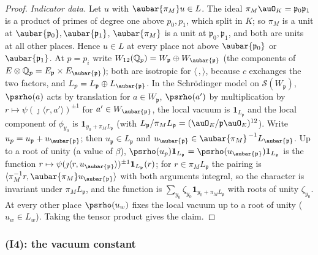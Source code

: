 \documentclass[10pt]{amsart}
\theoremstyle{definition}
\theoremstyle{remark}
\newcommand{\Q}{\mathbb Q}
\begin{document}
\begin{proof}
\emph{Indicator data.} Let $u$ with $\aubar{\pi_M}u\in L$. The ideal $\pi_M\auO_K=\mathfrak p_0
\mathfrak p_1$ is a product of primes of degree one above $p_0,p_1$, which split in $K$; so $\pi_M$
is a unit at $\aubar{\mathfrak p_0},\aubar{\mathfrak p_1}$, $\aubar{\pi_M}$ is a unit at
$\mathfrak p_0,\mathfrak p_1$, and both are units at all other places. Hence $u\in L$ at every
place not above $\aubar{\mathfrak p_0}$ or $\aubar{\mathfrak p_1}$. At
$p=p_i$ write $W_{12}(\Q_p)=W_{\mathfrak p}\oplus W_{\aubar{\mathfrak p}}$ (the components of
$E\otimes\Q_p=E_{\mathfrak p}\times E_{\aubar{\mathfrak p}}$); both are isotropic for $\langle\,,
\rangle$, because $c$ exchanges the two factors, and $L_p=L_{\mathfrak p}\oplus L_{\aubar{\mathfrak
p}}$. In the Schr\"odinger model on $\mathcal S(W_{\mathfrak p})$, $\psrho(a)$ acts by translation
for $a\in W_{\mathfrak p}$, $\psrho(a')$ by multiplication by $r\mapsto\psi(\jmath\langle r,a'
\rangle)^{\pm1}$ for $a'\in W_{\aubar{\mathfrak p}}$, the local vacuum is $\mathbf 1_{L_{\mathfrak
p}}$ and the local component of $\phi_{y_0}$ is $\mathbf 1_{y_0+\pi_ML_{\mathfrak p}}$ (with $L_{\mathfrak
p}/\pi_ML_{\mathfrak p}=(\auO_E/\mathfrak p\auO_E)^{12}$). Write $u_p=u_{\mathfrak p}+u_{\aubar{
\mathfrak p}}$; then $u_{\mathfrak p}\in L_{\mathfrak p}$ and $u_{\aubar{\mathfrak p}}\in
\aubar{\pi_M}^{\,-1}L_{\aubar{\mathfrak p}}$. Up to a root of unity (a value of $\beta$),
$\psrho(u_p)\mathbf 1_{L_{\mathfrak p}}=\psrho(u_{\aubar{\mathfrak p}})\mathbf 1_{L_{\mathfrak
p}}$ is the function $r\mapsto\psi(\jmath\langle r,u_{\aubar{\mathfrak p}}\rangle)^{\pm1}\mathbf
1_{L_{\mathfrak p}}(r)$; for $r\in\pi_ML_{\mathfrak p}$ the pairing is $\langle\pi_M^{-1}r,
\aubar{\pi_M}u_{\aubar{\mathfrak p}}\rangle$ with both arguments integral, so the character is
invariant under $\pi_ML_{\mathfrak p}$, and the function is $\sum_{y_0}\zeta_{y_0}\mathbf 1_{y_0+
\pi_ML_{\mathfrak p}}$ with roots of unity $\zeta_{y_0}$. At every other place $\psrho(u_w)$ fixes
the local vacuum up to a root of unity ($u_w\in L_w$). Taking the tensor product gives the claim.
\end{proof}

\subsubsection{(I4): the vacuum constant}\label{pst:ss-vac}
\end{document}
